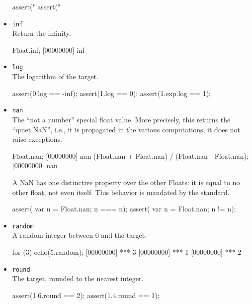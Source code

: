 \begin{itemize}
\begin{urbiscript}[firstnumber=last]
assert("%
assert("%
\end{urbiscript}

\item \lstinline|inf|\\
  Return the infinity.
\begin{urbiscript}[firstnumber=last]
Float.inf;
[00000000] inf
\end{urbiscript}

\item \lstinline|log|\\
  The logarithm of the target.
\begin{urbiscript}[firstnumber=last]
assert(0.log == -inf);
assert(1.log == 0);
assert(1.exp.log == 1);
\end{urbiscript}

\item \lstinline|nan|\\
  The ``not a number'' special float value.  More precisely, this
  returns the ``quiet NaN'', i.e., it is propagated in the various
  computations, it does not raise exceptions.
\begin{urbiscript}[firstnumber=last]
Float.nan;
[00000000] nan
(Float.nan + Float.nan) / (Float.nan - Float.nan);
[00000000] nan
\end{urbiscript}

A {NaN} has one distinctive property over the other Floats: it is
equal to no other float, not even itself.  This behavior is mandated
by the  standard.
\begin{urbiscript}[firstnumber=last]
assert({ var n = Float.nan; n === n});
assert({ var n = Float.nan; n  != n});
\end{urbiscript}

\item \lstinline|random|\\
  A random integer between 0 and the target.
\begin{urbiscript}[firstnumber=last]
for (3)
  echo(5.random);
[00000000] *** 3
[00000000] *** 1
[00000000] *** 2
\end{urbiscript}

\item \lstinline|round|\\
  The target, rounded to the nearest integer.
\begin{urbiscript}[firstnumber=last]
assert(1.6.round == 2);
assert(1.4.round == 1);
\end{urbiscript}


\end{itemize}
